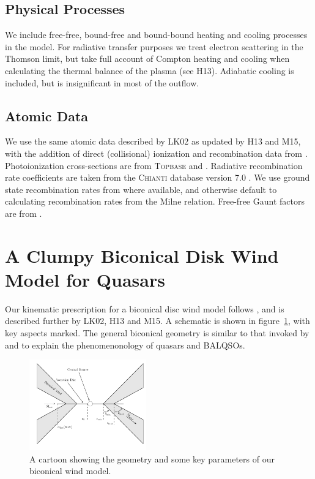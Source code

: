 \documentclass[useAMS,usenatbib]{mn2e_x}
\begin{document}
\subsection{Physical Processes}

We include  free-free, bound-free and bound-bound heating
and cooling processes in the model. For radiative transfer purposes
we treat electron scattering in the Thomson limit, 
but take full account of Compton heating and cooling when
calculating the thermal balance of the plasma (see H13).
Adiabatic cooling is included, but is insignificant 
in most of the outflow.


\subsection{Atomic Data}

We use the same atomic data  described by LK02 as updated by H13 and M15, 
with the addition of direct (collisional) ionization and recombination
data from \cite{dere2007}. 
Photoionization cross-sections are from \textsc{Topbase} \citep{cunto1993} and \cite{vfky}.
Radiative recombination rate coefficients are taken from 
the \textsc{Chianti} database version 7.0 \citep{dere1997,landi2012}.
We use ground state recombination rates from \cite{badnell2006} where available,
and otherwise default to calculating recombination rates from the Milne
relation. Free-free Gaunt factors are from \cite{sutherland1998}.





%
%

\section{A Clumpy Biconical Disk Wind Model for Quasars}

Our kinematic prescription for a biconical disc wind model
follows \cite{SV93}, and is described further by
LK02, H13 and M15. A schematic is shown in figure~\ref{fig:cartoon},
with key aspects marked. The general biconical
geometry is similar to that invoked by \cite{MCGV95} and 
\cite{elvis2000} to explain the phenomenonology
of quasars and BALQSOs.

\begin{figure} 
\centering
\includegraphics[width=0.45\textwidth]{figures/fig2_cartoon.png}
\caption
{
A cartoon showing the geometry and some key parameters of
our biconical wind model.
}
\label{fig:cartoon}
\end{figure} 
\end{document}
